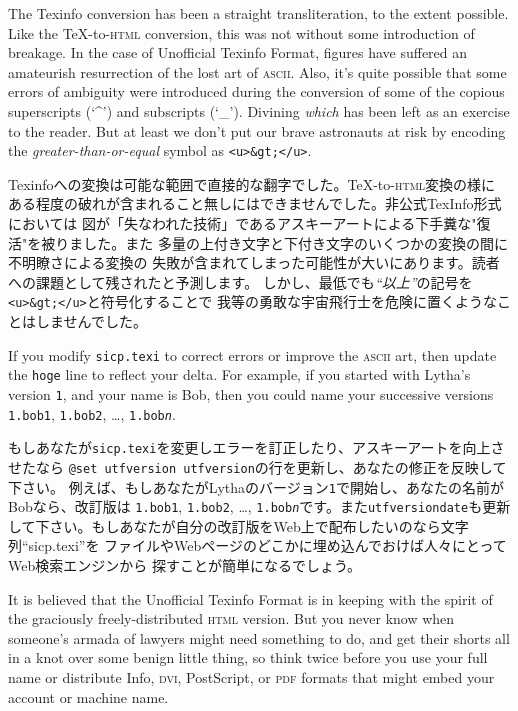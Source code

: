 \documentclass[oneside]{book}
\newcommand{\acronym}[1]{\textsc{\MakeLowercase{#1}}}
\newcommand{\code}[1]{\texttt{#1}}
\begin{document}
The Texinfo conversion has been a straight transliteration, to the extent
possible.  Like the {\TeX}-to-\acronym{HTML} conversion, this was not without
some introduction of breakage.  In the case of Unofficial Texinfo Format,
figures have suffered an amateurish resurrection of the lost art of
\acronym{ASCII}.  Also, it's quite possible that some errors of ambiguity
were introduced during the conversion of some of the copious superscripts (`\^{}')
and subscripts (`\_').  Divining \emph{which} has been left as an exercise to
the reader. But at least we don't put our brave astronauts at risk by encoding
the \emph{greater-than-or-equal} symbol as \code{<u>\&gt;</u>}.

Texinfoへの変換は可能な範囲で直接的な翻字でした。{\TeX}-to-\acronym{HTML}変換の様に
ある程度の破れが含まれること無しにはできませんでした。非公式TexInfo形式においては
図が「失なわれた技術」であるアスキーアートによる下手糞な"復活"を被りました。また
多量の上付き文字と下付き文字のいくつかの変換の間に不明瞭さによる変換の
失敗が含まれてしまった可能性が大いにあります。読者への課題として残されたと予測します。
しかし、最低でも\emph{``以上''}の記号を\texttt{<u>\&gt;</u>}と符号化することで
我等の勇敢な宇宙飛行士を危険に置くようなことはしませんでした。

If you modify \texttt{sicp.texi} to correct errors or improve the
\acronym{ASCII} art, then update the \code{hoge}
line to reflect your delta.  For example, if you started with Lytha's version
\code{1}, and your name is Bob, then you could name your successive versions
\code{1.bob1}, \code{1.bob2},  \dots , \code{1.bob\textit{n}}. 

もしあなたが\texttt{sicp.texi}を変更しエラーを訂正したり、アスキーアートを向上させたなら
\code{@set utfversion {utfversion}}の行を更新し、あなたの修正を反映して下さい。
例えば、もしあなたがLythaのバージョン\code{1}で開始し、あなたの名前がBobなら、改訂版は
\code{1.bob1}, \code{1.bob2}, \dots , \code{1.bob\textit{n}}です。また\code{utfversiondate}も更新
して下さい。もしあなたが自分の改訂版をWeb上で配布したいのなら文字列``sicp.texi''を
ファイルやWebページのどこかに埋め込んでおけば人々にとってWeb検索エンジンから
探すことが簡単になるでしょう。

It is believed that the Unofficial Texinfo Format is in keeping with the
spirit of the graciously freely-distributed \acronym{HTML} version.  But you
never know when someone's armada of lawyers might need something to do, and get
their shorts all in a knot over some benign little thing, so think twice before
you use your full name or distribute Info, \acronym{DVI}, PostScript, or
\acronym{PDF} formats that might embed your account or machine name.
\end{document}
